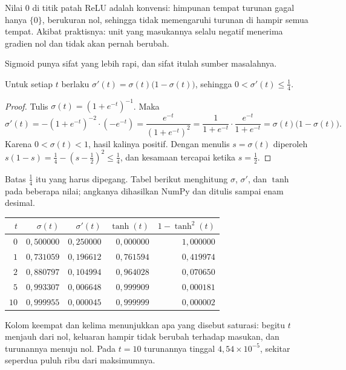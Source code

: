 Nilai $0$ di titik patah ReLU adalah konvensi: himpunan tempat turunan gagal hanya $\{0\}$, berukuran nol, sehingga tidak memengaruhi turunan di hampir semua tempat. Akibat praktisnya: unit yang masukannya selalu negatif menerima gradien nol dan tidak akan pernah berubah.

Sigmoid punya sifat yang lebih rapi, dan sifat itulah sumber masalahnya.

\begin{lemma}
Untuk setiap $t$ berlaku $\sigma'(t)=\sigma(t)\bigl(1-\sigma(t)\bigr)$, sehingga
$0<\sigma'(t)\le\tfrac14$.
\end{lemma}

\begin{proof}
Tulis $\sigma(t)=(1+e^{-t})^{-1}$. Maka
\[
  \sigma'(t)=-(1+e^{-t})^{-2}\cdot(-e^{-t})
  =\frac{e^{-t}}{(1+e^{-t})^{2}}
  =\frac{1}{1+e^{-t}}\cdot\frac{e^{-t}}{1+e^{-t}}
  =\sigma(t)\bigl(1-\sigma(t)\bigr).
\]
Karena $0<\sigma(t)<1$, hasil kalinya positif. Dengan menulis $s=\sigma(t)$ diperoleh
$s(1-s)=\tfrac14-(s-\tfrac12)^{2}\le\tfrac14$, dan kesamaan tercapai ketika $s=\tfrac12$.
\end{proof}

Batas $\tfrac14$ itu yang harus dipegang. Tabel berikut menghitung $\sigma$, $\sigma'$, dan
$\tanh$ pada beberapa nilai; angkanya dihasilkan NumPy dan ditulis sampai enam desimal.

\begin{center}
\small
\begin{tabular}{rrrrr}
\hline
$t$ & $\sigma(t)$ & $\sigma'(t)$ & $\tanh(t)$ & $1-\tanh^{2}(t)$ \\
\hline
$0$  & $0{,}500000$ & $0{,}250000$ & $0{,}000000$ & $1{,}000000$ \\
$1$  & $0{,}731059$ & $0{,}196612$ & $0{,}761594$ & $0{,}419974$ \\
$2$  & $0{,}880797$ & $0{,}104994$ & $0{,}964028$ & $0{,}070650$ \\
$5$  & $0{,}993307$ & $0{,}006648$ & $0{,}999909$ & $0{,}000181$ \\
$10$ & $0{,}999955$ & $0{,}000045$ & $0{,}999999$ & $0{,}000002$ \\
\hline
\end{tabular}
\end{center}

Kolom keempat dan kelima menunjukkan apa yang disebut saturasi: begitu $t$ menjauh dari nol,
keluaran hampir tidak berubah terhadap masukan, dan turunannya menuju nol. Pada $t=10$ turunannya tinggal $4{,}54\times10^{-5}$, sekitar seperdua puluh ribu dari maksimumnya.

